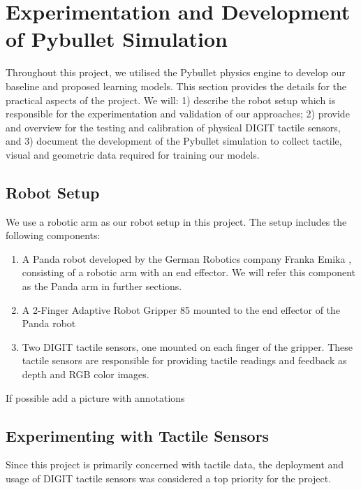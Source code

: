 \documentclass[12pt, a4paper]{report}
\theoremstyle{definition}
\begin{document}
\chapter{Experimentation and Development of Pybullet Simulation}
\label{chap:3}
Throughout this project, we utilised the Pybullet \cite{pybullet} physics engine to develop our baseline and proposed learning models. This section provides the details for the practical aspects of the project. We will: 1) describe the robot setup which is responsible for the experimentation and validation of our approaches; 2) provide and overview for the testing and calibration of physical DIGIT \cite{digit} tactile sensors, and 3) document the development of the Pybullet simulation to collect tactile, visual and geometric data required for training our models.

\section{Robot Setup}
\label{sec:3.1}
We use a robotic arm as our robot setup in this project. The setup includes the following components:
\begin{enumerate}
    \item A Panda robot developed by the German Robotics company Franka Emika \cite{franka}, consisting of a robotic arm with an end effector. We will refer this component as the Panda arm in further sections.
    \item A 2-Finger Adaptive Robot Gripper 85 \cite{robotiq} mounted to the end effector of the Panda robot
    \item Two DIGIT \cite{digit} tactile sensors, one mounted on each finger of the gripper. These tactile sensors are responsible for providing tactile readings and feedback as depth and RGB color images.
\end{enumerate}
{\color{red}If possible add a picture with annotations}


\section{Experimenting with Tactile Sensors}
\label{sec:3.2}
Since this project is primarily concerned with tactile data, the deployment and usage of DIGIT \cite{digit} tactile sensors was considered a top priority for the project.\\
\end{document}
